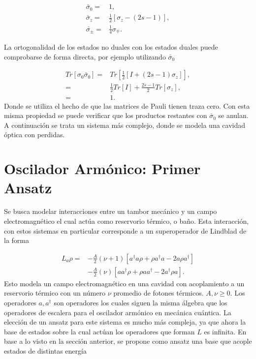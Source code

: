 \documentclass[a4paper,10pt]{report}
\begin{document}
\begin{align*}
\check{\sigma_0} =& 1,\\
\check{\sigma_z} =& \frac{1}{2}[\sigma_z-(2s-1)],\\
\check{\sigma_{\pm}} =& \frac{1}{4}\sigma_{\mp}.
\end{align*}

La ortogonalidad de los estados no duales con los estados duales puede comprobarse de forma directa, por ejemplo utilizando $\check{\sigma_0}$

\begin{align*}
Tr[\sigma_0\check{\sigma_0}] =& Tr[\frac{1}{2}[I + (2s-1)\sigma_z]],\\
=& \frac{1}{2} Tr[I] + \frac{2s-1}{2}Tr[\sigma_z],\\
=& 1.
\end{align*} Donde se utiliza el hecho de que las matrices de Pauli tienen traza cero. Con esta misma propiedad se puede verificar que los productos restantes con $\check{\sigma_0}$ se anulan. A continuación se trata un sistema más complejo, donde se modela una cavidad óptica con perdidas.

\section{Oscilador Armónico: Primer Ansatz}

Se busca modelar interacciones entre un tambor mecánico y un campo electromagnético el cual actúa como reservorio térmico, o baño. Esta interacción, con estos sistemas en particular corresponde a un superoperador de Lindblad de la forma \cite{EnglertDB}

\begin{align}\label{EMField}
L_a \rho =& - \frac{A}{2}(\nu + 1)[a^\dagger a\rho + \rho a^\dagger a -2a\rho a^\dagger] \nonumber \\
 &- \frac{A}{2}(\nu)[ aa^\dagger\rho + \rho  aa^\dagger -2a^\dagger\rho a].
\end{align} Esto modela un campo electromagnético en una cavidad con acoplamiento a un reservorio térmico con un número $\nu$ promedio de fotones térmicos. $A,\nu \geq 0$. Los operadores $a,a^{\dagger}$ son operadores los cuales siguen la misma álgebra que los operadores de escalera para el oscilador armónico en mecánica cuántica. La elección de un ansatz para este sistema es mucho más compleja, ya que ahora la base de estados sobre la cual actúan los operadores que forman $L$ es infinita.  En base a lo visto en la sección anterior, se propone como ansatz una base que acople estados de distintas energía
\end{document}

